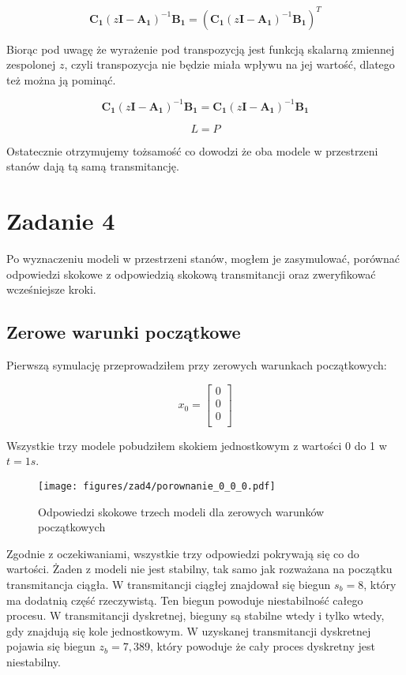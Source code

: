 \documentclass[a4paper,titlepage,11pt,floatssmall]{mwrep}
\begin{document}
$$
\mathbf{C_1} (z\mathbf{I} - \mathbf{A_1})^{-1} \mathbf{B_1} = (\mathbf{C_1} (z\mathbf{I} - \mathbf{A_1})^{-1} \mathbf{B_1})^{T}
$$

Biorąc pod uwagę że wyrażenie pod transpozycją jest funkcją skalarną zmiennej zespolonej $z$, czyli transpozycja nie będzie miała wpływu na jej wartość, dlatego też można ją pominąć.

$$
\mathbf{C_1} (z\mathbf{I} - \mathbf{A_1})^{-1} \mathbf{B_1} = \mathbf{C_1} (z\mathbf{I} - \mathbf{A_1})^{-1} \mathbf{B_1}
$$

$$
L = P
$$

Ostatecznie otrzymujemy tożsamość co dowodzi że oba modele w przestrzeni stanów dają tą samą transmitancję. 

\newpage

\section{Zadanie 4}

\indent{} Po wyznaczeniu modeli w przestrzeni stanów, mogłem je zasymulować, porównać odpowiedzi skokowe z odpowiedzią skokową transmitancji oraz zweryfikować wcześniejsze kroki. 

\subsection{Zerowe warunki początkowe}

\indent{} Pierwszą symulację przeprowadziłem przy zerowych warunkach początkowych:

$$
x_0 =
\left[\begin{array}{c}
0 \\
0 \\
0 \\
\end{array} \right]
$$

Wszystkie trzy modele pobudziłem skokiem jednostkowym z wartości 0 do 1 w $t = 1s$.

\begin{figure}[H]
\centering
\texttt{[image: figures/zad4/porownanie\_0\_0\_0.pdf]}
\caption{Odpowiedzi skokowe trzech modeli dla zerowych warunków początkowych}
\end{figure}

Zgodnie z oczekiwaniami, wszystkie trzy odpowiedzi pokrywają się co do wartości. Żaden z modeli nie jest stabilny, tak samo jak rozważana na początku transmitancja ciągła. W transmitancji ciągłej znajdował się biegun $s_b = 8$, który ma dodatnią część rzeczywistą. Ten biegun powoduje niestabilność całego procesu. W transmitancji dyskretnej, bieguny są stabilne wtedy i tylko wtedy, gdy znajdują się kole jednostkowym. W uzyskanej transmitancji dyskretnej pojawia się biegun $z_b = 7,389$, który powoduje że cały proces dyskretny jest niestabilny.
\end{document}
